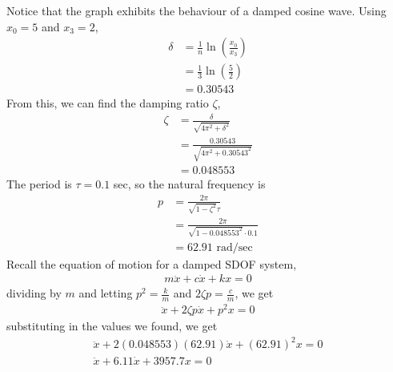 Notice that the graph exhibits the behaviour of a damped cosine wave. Using $x_0= 5$ and $x_3 = 2$, 
\begin{align*}
    \delta &= \frac{1}{n} \ln\left(\frac{x_0}{x_3}\right) \\
    &= \frac{1}{3} \ln\left(\frac{5}{2}\right) \\
    &= 0.30543
\end{align*}
From this, we can find the damping ratio $\zeta$,
\begin{align*}
    \zeta &= \frac{\delta}{\sqrt{4\pi^2 + \delta^2}} \\
    &= \frac{0.30543}{\sqrt{4\pi^2 + 0.30543^2}} \\
    &= 0.048553
\end{align*}
The period is $\tau = 0.1$ sec, so the natural frequency is 
\begin{align*}
    p &= \frac{2\pi}{\sqrt{1-\zeta^2} \tau} \\
    &= \frac{2\pi}{\sqrt{1-0.048553^2} \cdot 0.1} \\
    &= 62.91 \text{ rad/sec}
\end{align*}
Recall the equation of motion for a damped SDOF system,
\begin{align*}
    m\ddot{x} + c\dot{x} + kx = 0
\end{align*}
dividing by $m$ and letting $p^2 = \frac{k}{m}$ and $2\zeta p = \frac{c}{m}$, we get
\begin{align*}
    \ddot{x} + 2\zeta p\dot{x} + p^2x = 0
\end{align*}
substituting in the values we found, we get
\begin{gather*}
    \ddot{x} + 2(0.048553)(62.91)\dot{x} + (62.91)^2x = 0 \\
    \boxed{\ddot{x} + 6.11\dot{x} + 3957.7x = 0}
\end{gather*}
